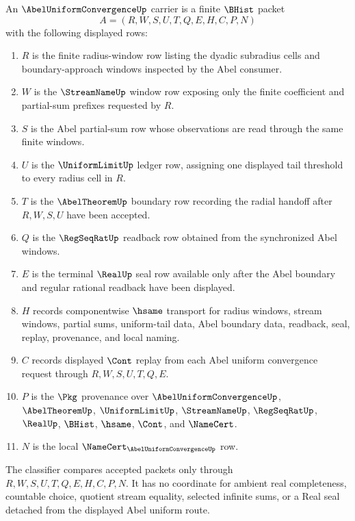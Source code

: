 \begin{definition}
\label{def:abel-uniform-convergence-carrier}
An $\AbelUniformConvergenceUp$ carrier is a finite $\BHist$ packet
$$
A=(R,W,S,U,T,Q,E,H,C,P,N)
$$
with the following displayed rows:
\begin{enumerate}
\item $R$ is the finite radius-window row listing the dyadic subradius cells and boundary-approach windows inspected by the Abel consumer.
\item $W$ is the $\StreamNameUp$ window row exposing only the finite coefficient and partial-sum prefixes requested by $R$.
\item $S$ is the Abel partial-sum row whose observations are read through the same finite windows.
\item $U$ is the $\UniformLimitUp$ ledger row, assigning one displayed tail threshold to every radius cell in $R$.
\item $T$ is the $\AbelTheoremUp$ boundary row recording the radial handoff after $R,W,S,U$ have been accepted.
\item $Q$ is the $\RegSeqRatUp$ readback row obtained from the synchronized Abel windows.
\item $E$ is the terminal $\RealUp$ seal row available only after the Abel boundary and regular rational readback have been displayed.
\item $H$ records componentwise $\hsame$ transport for radius windows, stream windows, partial sums, uniform-tail data, Abel boundary data, readback, seal, replay, provenance, and local naming.
\item $C$ records displayed $\Cont$ replay from each Abel uniform convergence request through $R,W,S,U,T,Q,E$.
\item $P$ is the $\Pkg$ provenance over $\AbelUniformConvergenceUp$, $\AbelTheoremUp$, $\UniformLimitUp$, $\StreamNameUp$, $\RegSeqRatUp$, $\RealUp$, $\BHist$, $\hsame$, $\Cont$, and $\NameCert$.
\item $N$ is the local $\NameCert_{\AbelUniformConvergenceUp}$ row.
\end{enumerate}
The classifier compares accepted packets only through $R,W,S,U,T,Q,E,H,C,P,N$. It has no coordinate for ambient real completeness, countable choice, quotient stream equality, selected infinite sums, or a Real seal detached from the displayed Abel uniform route.
\end{definition}

